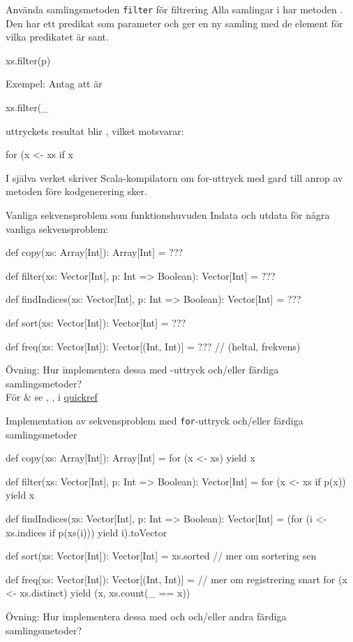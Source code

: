 \begin{Slide}{Använda samlingsmetoden \texttt{filter} för filtrering}
Alla samlingar i  har metoden . Den har ett predikat som parameter  och ger en ny samling med de element för vilka predikatet är sant.
\begin{Code}[basicstyle=\ttfamily\SlideFontSize{12}{14}]
xs.filter(p)
\end{Code}
\pause
Exempel: Antag att  är 
\begin{REPLnonum}
xs.filter(_ %
\end{REPLnonum}
\pause
uttryckets resultat blir , vilket motsvarar:
\begin{Code}[basicstyle=\ttfamily\SlideFontSize{10}{13}]
for (x <- xs if x %
\end{Code}
\pause
I själva verket skriver Scala-kompilatorn om for-uttryck med gard till anrop av metoden  före kodgenerering sker.
\end{Slide}


\begin{Slide}{Vanliga sekvensproblem som funktionshuvuden}
Indata och utdata för några vanliga sekvensproblem:
\begin{Code}
def copy(xs: Array[Int]): Array[Int] = ???

def filter(xs: Vector[Int], p: Int => Boolean): Vector[Int] = ???

def findIndices(xs: Vector[Int], p: Int => Boolean): Vector[Int] = ???

def sort(xs: Vector[Int]): Vector[Int] = ???

def freq(xs: Vector[Int]): Vector[(Int, Int)] = ???  // (heltal, frekvens)
\end{Code}
Övning: Hur implementera dessa med -uttryck och/eller färdiga samlingsmetoder?\\
 För \& se , ,  i \href{http://cs.lth.se/pgk/quickref/}{quickref}
\end{Slide}


\begin{Slide}{Implementation av sekvensproblem med \texttt{for}-uttryck och/eller färdiga samlingsmetoder}
\begin{Code}
def copy(xs: Array[Int]): Array[Int] = for (x <- xs) yield x

def filter(xs: Vector[Int], p: Int => Boolean): Vector[Int] =
  for (x <- xs if p(x)) yield x

def findIndices(xs: Vector[Int], p: Int => Boolean): Vector[Int] =
  (for (i <- xs.indices if p(xs(i))) yield i).toVector

def sort(xs: Vector[Int]): Vector[Int] = xs.sorted // mer om sortering sen

def freq(xs: Vector[Int]): Vector[(Int, Int)] = // mer om registrering snart
  for (x <- xs.distinct) yield (x, xs.count(_ == x))
\end{Code}
Övning: Hur implementera dessa med  och  och/eller andra färdiga samlingsmetoder?
\end{Slide}

